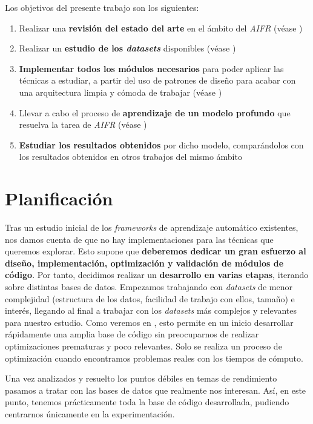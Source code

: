 Los objetivos del presente trabajo son los siguientes:

\begin{enumerate}
	\item Realizar una \textbf{revisión del estado del arte} en el ámbito del \textit{AIFR} (véase )
	\item Realizar un \textbf{estudio de los \textit{datasets}} disponibles (véase )
	\item \textbf{Implementar todos los módulos necesarios} para poder aplicar las técnicas a estudiar, a partir del uso de patrones de diseño para acabar con una arquitectura limpia y cómoda de trabajar (véase )
	\item Llevar a cabo el proceso de \textbf{aprendizaje de un modelo profundo} que resuelva la tarea de \textit{AIFR} (véase )
	\item \textbf{Estudiar los resultados obtenidos} por dicho modelo, comparándolos con los resultados obtenidos en otros trabajos del mismo ámbito
\end{enumerate}

\section{Planificación} \label{isec:planificacion}

Tras un estudio inicial de los \textit{frameworks} de aprendizaje automático existentes, nos damos cuenta de que no hay implementaciones para las técnicas que queremos explorar. Esto supone que \textbf{deberemos dedicar un gran esfuerzo al diseño, implementación, optimización y validación de módulos de código}. Por tanto, decidimos realizar un \textbf{desarrollo en varias etapas}, iterando sobre distintas bases de datos. Empezamos trabajando con \textit{datasets} de menor complejidad (estructura de los datos, facilidad de trabajo con ellos, tamaño) e interés, llegando al final a trabajar con los \textit{datasets} más complejos y relevantes para nuestro estudio. Como veremos en , esto permite en un inicio desarrollar rápidamente una amplia base de código sin preocuparnos de realizar optimizaciones prematuras y poco relevantes. Solo se realiza un proceso de optimización cuando encontramos problemas reales con los tiempos de cómputo.

Una vez analizados y resuelto los puntos débiles en temas de rendimiento pasamos a tratar con las bases de datos que realmente nos interesan. Así, en este punto, tenemos prácticamente toda la base de código desarrollada, pudiendo centrarnos únicamente en la experimentación.

